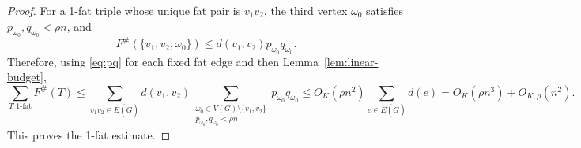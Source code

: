 \documentclass[10pt,a4paper]{amsart}
\begin{document}
\begin{proof}
For a 1-fat triple whose unique fat pair is \(v_1v_2\), the third vertex \(\omega_0\) satisfies
\(p_{\omega_0},q_{\omega_0}<\rho n\), and
\[
  F^{\#}(\{v_1,v_2,\omega_0\})\le d(v_1,v_2)p_{\omega_0}q_{\omega_0}.
\]
Therefore, using \eqref{eq:pq} for each fixed fat edge and then Lemma~\ref{lem:linear-budget},
\[
  \sum_{T\text{ 1-fat}}F^{\#}(T)
  \le
  \sum_{v_1v_2\in E(\tilde{G})}d(v_1,v_2)
  \sum_{\substack{\omega_0\in V(G)\setminus\{v_1,v_2\}\\p_{\omega_0},q_{\omega_0}<\rho n}}
  p_{\omega_0}q_{\omega_0}
  \le O_K(\rho n^2)\sum_{e\in E(\tilde{G})}d(e)
  =O_K(\rho n^3)+O_{K,\rho}(n^2).
\]
This proves the 1-fat estimate.
\end{proof}
\end{document}
